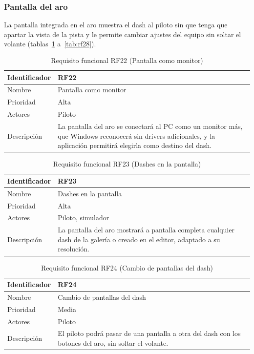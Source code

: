 \subsubsection{Pantalla del aro}

La pantalla integrada en el aro muestra el dash al piloto sin que tenga que apartar la vista de la pista y le permite cambiar ajustes del equipo sin soltar el volante (tablas~\ref{tab:rf22} a~\ref{tab:rf28}).

\begin{table}[H]
	\centering
	\renewcommand{\arraystretch}{2}
	\begin{tabular}{|l|p{10cm}|}
		\hline
		Identificador & RF22 \\
		\hline
		Nombre & Pantalla como monitor \\
		\hline
		Prioridad & Alta \\
		\hline
		Actores & Piloto \\
		\hline
		Descripción & La pantalla del aro se conectará al PC como un monitor más, que Windows reconocerá sin drivers adicionales, y la aplicación permitirá elegirla como destino del dash. \\
		\hline
	\end{tabular}
	\caption{Requisito funcional RF22 (Pantalla como monitor)}
	\label{tab:rf22}
\end{table}

\begin{table}[H]
	\centering
	\renewcommand{\arraystretch}{2}
	\begin{tabular}{|l|p{10cm}|}
		\hline
		Identificador & RF23 \\
		\hline
		Nombre & Dashes en la pantalla \\
		\hline
		Prioridad & Alta \\
		\hline
		Actores & Piloto, simulador \\
		\hline
		Descripción & La pantalla del aro mostrará a pantalla completa cualquier dash de la galería o creado en el editor, adaptado a su resolución. \\
		\hline
	\end{tabular}
	\caption{Requisito funcional RF23 (Dashes en la pantalla)}
	\label{tab:rf23}
\end{table}

\begin{table}[H]
	\centering
	\renewcommand{\arraystretch}{2}
	\begin{tabular}{|l|p{10cm}|}
		\hline
		Identificador & RF24 \\
		\hline
		Nombre & Cambio de pantallas del dash \\
		\hline
		Prioridad & Media \\
		\hline
		Actores & Piloto \\
		\hline
		Descripción & El piloto podrá pasar de una pantalla a otra del dash con los botones del aro, sin soltar el volante. \\
		\hline
	\end{tabular}
	\caption{Requisito funcional RF24 (Cambio de pantallas del dash)}
	\label{tab:rf24}
\end{table}

